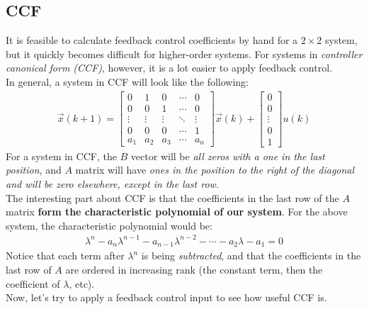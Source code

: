 \subsection*{CCF}
It is feasible to calculate feedback control coefficients by hand for a $2 \times 2$ system, but it quickly becomes difficult for higher-order systems. For systems in \textit{controller canonical form (CCF)}, however, it is a lot easier to apply feedback control. \\
\newline
In general, a system in CCF will look like the following:
\begin{align*}
    \vec{x}(k + 1) = \begin{bmatrix}
        0 & 1 & 0 & \cdots & 0 \\
        0 & 0 & 1 & \cdots & 0 \\
        \vdots & \vdots & \vdots & \ddots & \vdots \\
        0 & 0 & 0 & \cdots & 1 \\
        a_1 & a_2 & a_3 & \cdots & a_n
    \end{bmatrix} \vec{x}(k) + \begin{bmatrix}
        0 \\ 0 \\ \vdots \\ 0 \\ 1
    \end{bmatrix} u(k)
\end{align*}
For a system in CCF, the $B$ vector will be \textit{all zeros with a one in the last position}, and $A$ matrix will have \textit{ones in the position to the right of the diagonal and will be zero elsewhere, except in the last row}. \\
\newline
The interesting part about CCF is that the coefficients in the last row of the $A$ matrix \textbf{form the characteristic polynomial of our system}. 
For the above system, the characteristic polynomial would be:
\begin{align*}
    \lambda^n - a_n \lambda^{n - 1} - a_{n - 1}\lambda^{n - 2} - \cdots - a_2 \lambda - a_1 = 0
\end{align*}
Notice that each term after $\lambda^n$ is being \textit{subtracted}, and that the coefficients in the last row of $A$ are ordered in increasing rank (the constant term, then the coefficient of $\lambda$, etc). \\
\newline
Now, let's try to apply a feedback control input to see how useful CCF is.
